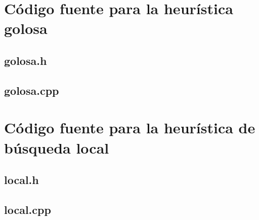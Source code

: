 \documentclass[a4paper, 10pt, twoside]{article}
\begin{document}




\newpage

\section{Código fuente para la heurística golosa}


\subsection{golosa.h}




\subsection{golosa.cpp}






\newpage

\section{Código fuente para la heurística de búsqueda local}


\subsection{local.h}




\subsection{local.cpp}




\end{document}

